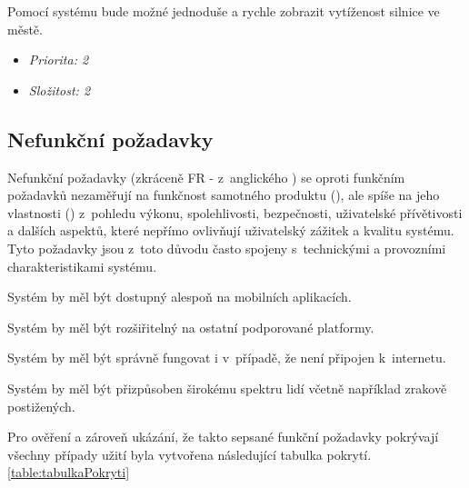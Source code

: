 Pomocí systému bude možné jednoduše a rychle zobrazit vytíženost silnice ve městě.

\begin{itemize}
  \item \textit{Priorita: 2}
  \item \textit{Složitost: 2}
\end{itemize}

\subsection{Nefunkční požadavky}
Nefunkční požadavky (zkráceně FR - z~anglického ) se oproti funkčním požadavků nezaměřují na funkčnost samotného produktu (),
ale spíše na jeho vlastnosti () z~pohledu
výkonu, spolehlivosti, bezpečnosti, uživatelské přívětivosti a dalších aspektů, které nepřímo ovlivňují uživatelský zážitek a kvalitu systému. 
Tyto požadavky jsou z~toto důvodu často spojeny s~technickými a provozními charakteristikami systému.

Systém by měl být dostupný alespoň na mobilních aplikacích.



Systém by měl být rozšiřitelný na ostatní podporované platformy. %

Systém by měl být správně fungovat i v~případě, že není připojen k~internetu.

Systém by měl být přizpůsoben širokému spektru lidí včetně například zrakově postižených.


Pro ověření a zároveň ukázání, že takto sepsané funkční požadavky pokrývají všechny případy užití 
byla vytvořena následující tabulka pokrytí. \ref{table:tabulkaPokryti}

